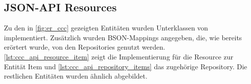 \subsection{JSON-API Resources}
\label{ssec:ba_json_api_resources}

Zu den in \cref{fig:er_ccc} gezeigten Entitäten wurden Unterklassen von
 implementiert.  Zusätzlich wurden BSON-Mappings
angegeben, die, wie bereits erörtert wurde, von den Repositories genutzt
werden.  \cref{lst:ccc_api_resource_item} zeigt die Implementierung für die
Resource zur Entität Item und \cref{lst:ccc_api_repository_items} das zugehörige
Repository.  Die restlichen Entitäten wurden ähnlich abgebildet.




